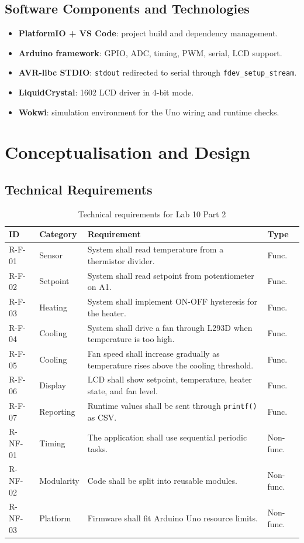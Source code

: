 \documentclass[12pt]{article}
\begin{document}
\subsection{Software Components and Technologies}

\begin{itemize}
    \item \textbf{PlatformIO + VS Code}: project build and dependency management.
    \item \textbf{Arduino framework}: GPIO, ADC, timing, PWM, serial, LCD support.
    \item \textbf{AVR-libc STDIO}: \texttt{stdout} redirected to serial through \texttt{fdev\_setup\_stream}.
    \item \textbf{LiquidCrystal}: 1602 LCD driver in 4-bit mode.
    \item \textbf{Wokwi}: simulation environment for the Uno wiring and runtime checks.
\end{itemize}

\section{Conceptualisation and Design}

\subsection{Technical Requirements}

\begin{table}[H]
\centering
\small
\begin{tabular}{p{1.5cm} p{2.6cm} p{7.1cm} p{1.3cm}}
\toprule
\textbf{ID} & \textbf{Category} & \textbf{Requirement} & \textbf{Type} \\
\midrule
R-F-01 & Sensor & System shall read temperature from a thermistor divider. & Func. \\
R-F-02 & Setpoint & System shall read setpoint from potentiometer on A1. & Func. \\
R-F-03 & Heating & System shall implement ON-OFF hysteresis for the heater. & Func. \\
R-F-04 & Cooling & System shall drive a fan through L293D when temperature is too high. & Func. \\
R-F-05 & Cooling & Fan speed shall increase gradually as temperature rises above the cooling threshold. & Func. \\
R-F-06 & Display & LCD shall show setpoint, temperature, heater state, and fan level. & Func. \\
R-F-07 & Reporting & Runtime values shall be sent through \texttt{printf()} as CSV. & Func. \\
R-NF-01 & Timing & The application shall use sequential periodic tasks. & Non-func. \\
R-NF-02 & Modularity & Code shall be split into reusable modules. & Non-func. \\
R-NF-03 & Platform & Firmware shall fit Arduino Uno resource limits. & Non-func. \\
\bottomrule
\end{tabular}
\caption{Technical requirements for Lab 10 Part 2}
\label{tab:requirements}
\end{table}
\end{document}
